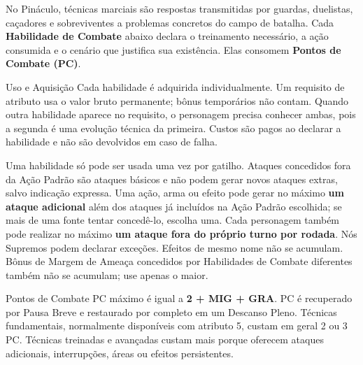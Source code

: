 
No Pináculo, técnicas marciais são respostas transmitidas por guardas, duelistas, caçadores e sobreviventes a problemas concretos do campo de batalha. Cada \textbf{Habilidade de Combate} abaixo declara o treinamento necessário, a ação consumida e o cenário que justifica sua existência. Elas consomem \textbf{Pontos de Combate (PC)}.

\begin{rpgboxtips}{Uso e Aquisição}
Cada habilidade é adquirida individualmente. Um requisito de atributo usa o valor bruto permanente; bônus temporários não contam. Quando outra habilidade aparece no requisito, o personagem precisa conhecer ambas, pois a segunda é uma evolução técnica da primeira. Custos são pagos ao declarar a habilidade e não são devolvidos em caso de falha.

Uma habilidade só pode ser usada uma vez por gatilho. Ataques concedidos fora da Ação Padrão são ataques básicos e não podem gerar novos ataques extras, salvo indicação expressa. Uma ação, arma ou efeito pode gerar no máximo \textbf{um ataque adicional} além dos ataques já incluídos na Ação Padrão escolhida; se mais de uma fonte tentar concedê-lo, escolha uma. Cada personagem também pode realizar no máximo \textbf{um ataque fora do próprio turno por rodada}. Nós Supremos podem declarar exceções. Efeitos de mesmo nome não se acumulam. Bônus de Margem de Ameaça concedidos por Habilidades de Combate diferentes também não se acumulam; use apenas o maior.
\end{rpgboxtips}

\begin{rpgboxtips}{Pontos de Combate}
PC máximo é igual a \textbf{2 + MIG + GRA}. PC é recuperado por Pausa Breve e restaurado por completo em um Descanso Pleno. Técnicas fundamentais, normalmente disponíveis com atributo 5, custam em geral 2 ou 3 PC. Técnicas treinadas e avançadas custam mais porque oferecem ataques adicionais, interrupções, áreas ou efeitos persistentes.
\end{rpgboxtips}




